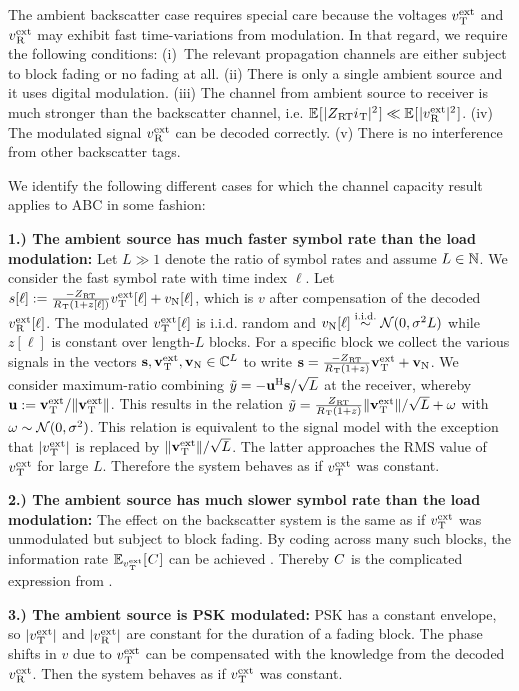 The ambient backscatter case requires special care because the voltages $v_{\hspace{.2mm}\mathrm{T}}^\mathrm{ext}$ and $v_{\hspace{.2mm}\mathrm{R}}^\mathrm{ext}$ may exhibit fast time-variations from modulation.
In that regard, we require the following conditions:
\mbox{(i) The} relevant propagation channels are either subject to block fading or no fading at all.
(ii) There is only a single ambient source and it uses digital modulation.
(iii) The channel from ambient source to receiver is much stronger than the backscatter channel, i.e. $\mathbb{E}_{}[\hspace{.2mm}|Z_{\hspace{.2mm}\mathrm{RT}} i_{\hspace{.2mm}\mathrm{T}}|^2\hspace{.2mm}] \ll \mathbb{E}_{}[\hspace{.2mm}|v_{\hspace{.2mm}\mathrm{R}}^\mathrm{ext}|^2\hspace{.2mm}]$.
(iv) The modulated signal $v_{\hspace{.2mm}\mathrm{R}}^\mathrm{ext}$ can be decoded correctly.
(v) There is no interference from other backscatter tags.

We identify the following different cases for which the channel capacity result  applies to ABC in some fashion:

\textbf{1.) The ambient source has much faster symbol rate than the load modulation:} Let $L \gg 1$ denote the ratio of symbol rates and assume $L \in \mathbb{N}$. We consider the fast symbol rate with time index $\ell$. Let $s[\ell] := \frac{-Z_{\hspace{.2mm}\mathrm{RT}}}{R_{\hspace{.2mm}\mathrm{T}}(1 + z[\ell])} v_{\hspace{.2mm}\mathrm{T}}^\mathrm{ext}[\ell] + v_\mathrm{N}[\ell]$, which is $v$ after compensation of the decoded $v_{\hspace{.2mm}\mathrm{R}}^\mathrm{ext}[\ell]$. The modulated $v_{\hspace{.2mm}\mathrm{T}}^\mathrm{ext}[\ell]$ is i.i.d. random and $v_\mathrm{N}[\ell] \overset{\text{i.i.d.}}{\sim} \mathcal{N}(0,\sigma^2 L)$ while $z[\ell]$ is constant over length-$L$ blocks. For a specific block %
we collect the various signals in the vectors ${\bf s}, {\bf v}_{\hspace{.2mm}\mathrm{T}}^\mathrm{ext}, {\bf v}_\mathrm{N} \in \mathbb{C}^L$ to write
${\bf s}
= \frac{-Z_{\hspace{.2mm}\mathrm{RT}}}{R_{\hspace{.2mm}\mathrm{T}}(1 + z)} {\bf v}_{\hspace{.2mm}\mathrm{T}}^\mathrm{ext} + {\bf v}_\mathrm{N}$.
We consider maximum-ratio combining
$\tilde{y} = - {\bf u}^\mathrm{\normalfont{H}} {\bf s} / \sqrt{L}$ at the receiver, whereby
${\bf u} := {\bf v}_{\hspace{.2mm}\mathrm{T}}^\mathrm{ext} / \|{\bf v}_{\hspace{.2mm}\mathrm{T}}^\mathrm{ext}\|$.
This results in the relation $\tilde{y} = \frac{Z_{\hspace{.2mm}\mathrm{RT}}}{R_{\hspace{.2mm}\mathrm{T}}(1 + z)} \|{\bf v}_{\hspace{.2mm}\mathrm{T}}^\mathrm{ext}\| / \sqrt{L} + \omega$ with $\omega \sim \mathcal{N}(0,\sigma^2)$. This relation is equivalent to the signal model  with the exception that $|v_{\hspace{.2mm}\mathrm{T}}^\mathrm{ext}|$ is replaced by $\|{\bf v}_{\hspace{.2mm}\mathrm{T}}^\mathrm{ext}\| / \sqrt{L}$. The latter approaches the RMS value of $v_{\hspace{.2mm}\mathrm{T}}^\mathrm{ext}$ for large $L$. Therefore the system behaves as if $v_{\hspace{.2mm}\mathrm{T}}^\mathrm{ext}$ was constant.

\textbf{2.) The ambient source has much slower symbol rate than the load modulation:} The effect on the backscatter system is the same as if $v_{\hspace{.2mm}\mathrm{T}}^\mathrm{ext}$ was unmodulated but subject to block fading. By coding across many such blocks, the information rate $\mathbb{E}_{v_{\hspace{.2mm}\mathrm{T}}^\mathrm{ext}}[\hspace{.2mm}C\hspace{.2mm}]$ can be achieved \cite[Sec.~5.4.5]{Tse2005}. Thereby $C$ is the complicated expression from .

\textbf{3.) The ambient source is PSK modulated:} PSK has a constant envelope, so $|v_{\hspace{.2mm}\mathrm{T}}^\mathrm{ext}|$ and $|v_{\hspace{.2mm}\mathrm{R}}^\mathrm{ext}|$ are constant for the duration of a fading block. The phase shifts in $v$ due to $v_{\hspace{.2mm}\mathrm{T}}^\mathrm{ext}$ can be compensated with the knowledge from the decoded $v_{\hspace{.2mm}\mathrm{R}}^\mathrm{ext}$. Then the system behaves as if $v_{\hspace{.2mm}\mathrm{T}}^\mathrm{ext}$ was constant.